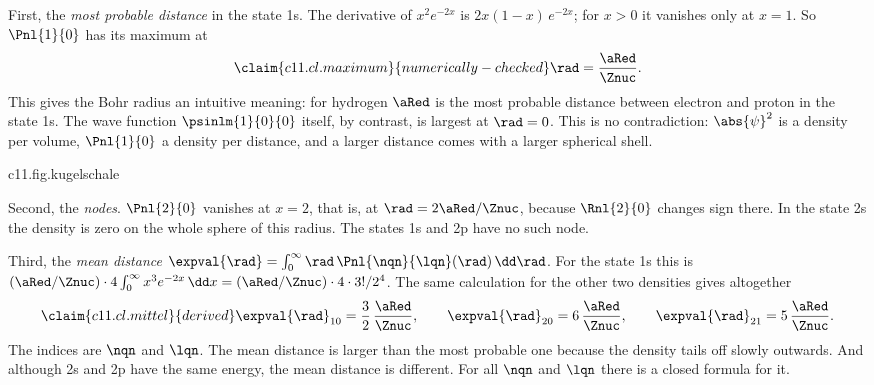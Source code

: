 First, the \emph{most probable distance} in the state 1s. The derivative of
$x^2 e^{-2x}$ is $2x(1 - x)\,e^{-2x}$; for $x > 0$ it vanishes only at $x = 1$. So
$\Pnl{1}{0}$ has its maximum at
\begin{equation}\label{c11.eq.maximum}\claim{c11.cl.maximum}{numerically-checked}
  \rad = \frac{\aRed}{\Znuc} .
\end{equation}
This gives the Bohr radius an intuitive meaning: for hydrogen $\aRed$ is the most
probable distance between electron and proton in the state 1s. The wave function
$\psinlm{1}{0}{0}$ itself, by contrast, is largest at $\rad = 0$. This is no
contradiction: $\abs{\psi}^2$ is a density per volume, $\Pnl{1}{0}$ a density per
distance, and a larger distance comes with a larger spherical shell.

\begin{tpcfigure}{c11.fig.kugelschale}
  \caption{Why the radial probability density of 1s starts at zero, for $\Znuc = 1$. Dashed: the scaled density $\pi\aRed^3\abs{\psinlm{1}{0}{0}}^2 = e^{-2x}$ per volume, largest at the origin. Thin: $\rad^2/\aRed^2 = x^2$, the sphere's area divided by $4\pi\aRed^2$. Heavy: $\aRed\Pnl{1}{0} = 4x^2 e^{-2x}$, the scaled density per distance, hence four times the product of the thin and dashed curves; its maximum lies at $\rad = \aRed$. Here $x = \rad/\aRed$.}
\end{tpcfigure}

Second, the \emph{nodes}. $\Pnl{2}{0}$ vanishes at $x = 2$, that is, at
$\rad = 2\aRed/\Znuc$, because $\Rnl{2}{0}$ changes sign there. In the state 2s the
density is zero on the whole sphere of this radius. The states 1s and 2p have no such
node.

Third, the \emph{mean distance} $\expval{\rad} = \int_0^\infty \rad\,
\Pnl{\nqn}{\lqn}(\rad)\,\dd\rad$. For the state 1s this is
$(\aRed/\Znuc) \cdot 4\int_0^\infty x^3 e^{-2x}\,\dd x = (\aRed/\Znuc) \cdot 4 \cdot
3!/2^4$. The same calculation for the other two densities gives altogether
\begin{equation}\label{c11.eq.mittel}\claim{c11.cl.mittel}{derived}
  \expval{\rad}_{10} = \frac{3}{2}\,\frac{\aRed}{\Znuc},
  \qquad
  \expval{\rad}_{20} = 6\,\frac{\aRed}{\Znuc},
  \qquad
  \expval{\rad}_{21} = 5\,\frac{\aRed}{\Znuc} .
\end{equation}
The indices are $\nqn$ and $\lqn$. The mean distance is larger than the most probable
one because the density tails off slowly outwards. And although 2s and 2p have the same
energy, the mean distance is different. For all $\nqn$ and $\lqn$ there is a closed
formula for it.

